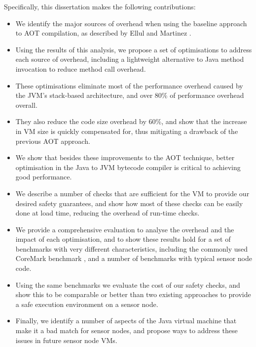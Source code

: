 Specifically, this dissertation makes the following contributions:
\begin{itemize}
    \item We identify the major sources of overhead when using the baseline approach to AOT compilation, as described by Ellul and Martinez \cite{Ellul:2010iw, Ellul:2012thesis}.
    \item Using the results of this analysis, we propose a set of optimisations to address each source of overhead, including a lightweight alternative to Java method invocation to reduce method call overhead.
    \item These optimisations eliminate most of the performance overhead caused by the JVM's stack-based architecture, and over 80\% of performance overhead overall.
    \item They also reduce the code size overhead by 60\%, and show that the increase in VM size is quickly compensated for, thus mitigating a drawback of the previous AOT approach.
    \item We show that besides these improvements to the AOT technique, better optimisation in the Java to JVM bytecode compiler is critical to achieving good performance.
    \item We describe a number of checks that are sufficient for the VM to provide our desired safety guarantees, and show how most of these checks can be easily done at load time, reducing the overhead of run-time checks.
    \item We provide a comprehensive evaluation to analyse the overhead and the impact of each optimisation, and to show these results hold for a set of benchmarks with very different characteristics, including the commonly used CoreMark benchmark \cite{coremark}, and a number of benchmarks with typical sensor node code.
    \item Using the same benchmarks we evaluate the cost of our safety checks, and show this to be comparable or better than two existing approaches to provide a safe execution environment on a sensor node.
    \item Finally, we identify a number of aspects of the Java virtual machine that make it a bad match for sensor nodes, and propose ways to address these issues in future sensor node VMs.
\end{itemize}

